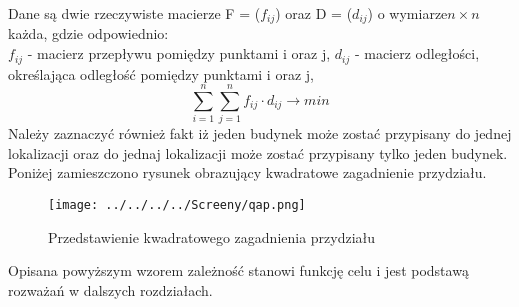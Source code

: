 Dane są dwie rzeczywiste macierze F = ($f_{ij}$) oraz D = ($d_{ij}$) o wymiarze$ n \times n $każda, gdzie odpowiednio:\\
$f_{ij}$ - macierz przepływu pomiędzy punktami i oraz j,
$d_{ij}$ - macierz odległości, określająca odległość pomiędzy punktami i oraz j,
$$
\sum_{i=1}^{n}\sum_{j=1}^{n}f_{ij} \cdot d_{ij} \longrightarrow min
$$
Należy zaznaczyć również fakt iż jeden budynek może zostać przypisany do jednej lokalizacji oraz do jednaj lokalizacji może zostać  przypisany tylko jeden budynek. Poniżej zamieszczono rysunek obrazujący kwadratowe zagadnienie przydziału.

\begin{figure}[h!]
\begin{center}
		\texttt{[image: ../../../../Screeny/qap.png]}
		\caption{Przedstawienie kwadratowego zagadnienia przydziału \cite{qap_rys}}
		\label{qap}		
\end{center}	
\end{figure}

Opisana powyższym wzorem zależność stanowi funkcję celu i jest podstawą rozważań w dalszych rozdziałach.
